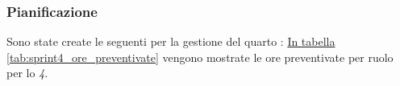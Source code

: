 \subsubsection{Pianificazione}
Sono state create le seguenti  per la gestione del quarto : 
\hyperref[tab:sprint4_ore_preventivate]{In tabella \ref{tab:sprint4_ore_preventivate}} vengono mostrate le ore preventivate per ruolo per lo \textit{ 4}.

\begin{table}[H]
    \centering
    \caption{Ore preventivate per ruolo Sprint 4}
    \label{tab:sprint4_ore_preventivate}
\end{table}